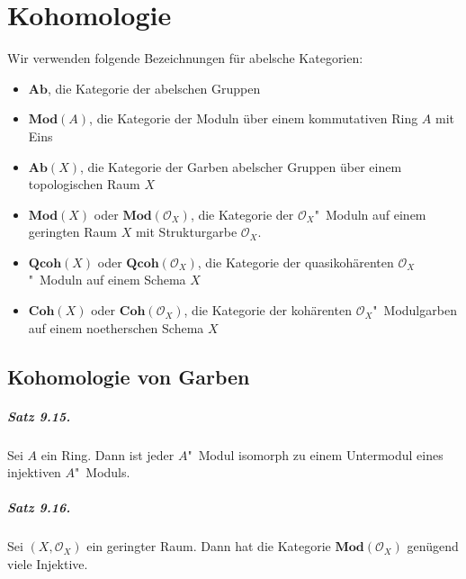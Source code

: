 \chapter{Kohomologie}

Wir verwenden folgende Bezeichnungen für abelsche Kategorien:
\begin{itemize}
\item $\mathbf{Ab}$, die Kategorie der abelschen Gruppen
\item $\mathbf{Mod}(A)$, die Kategorie der Moduln über einem kommutativen Ring $A$ mit Eins
\item $\mathbf{Ab}(X)$, die Kategorie der Garben abelscher Gruppen über einem topologischen Raum $X$
\item $\mathbf{Mod}(X)$ oder $\mathbf{Mod}(\mathcal{O}_X)$, die Kategorie der $\mathcal{O}_X$"~Moduln auf einem geringten Raum $X$ mit Strukturgarbe $\mathcal{O}_X$.
\item $\mathbf{Qcoh}(X)$ oder $\mathbf{Qcoh}(\mathcal{O}_X)$, die Kategorie der quasikohärenten $\mathcal{O}_X$"~Moduln auf einem Schema $X$
\item $\mathbf{Coh}(X)$ oder $\mathbf{Coh}(\mathcal{O}_X)$, die Kategorie der kohärenten $\mathcal{O}_X$"~Modulgarben auf einem noetherschen Schema $X$
\end{itemize}

\section{Kohomologie von Garben}

\paragraph{Satz 9.15.}\label{9.15} Sei $A$ ein Ring. Dann ist jeder $A$"~Modul isomorph zu einem Untermodul eines injektiven $A$"~Moduls.

\paragraph{Satz 9.16.}\label{9.16} Sei $(X,\mathcal{O}_X)$ ein geringter Raum. Dann hat die Kategorie $\mathbf{Mod}(\mathcal{O}_X)$ genügend viele Injektive.

